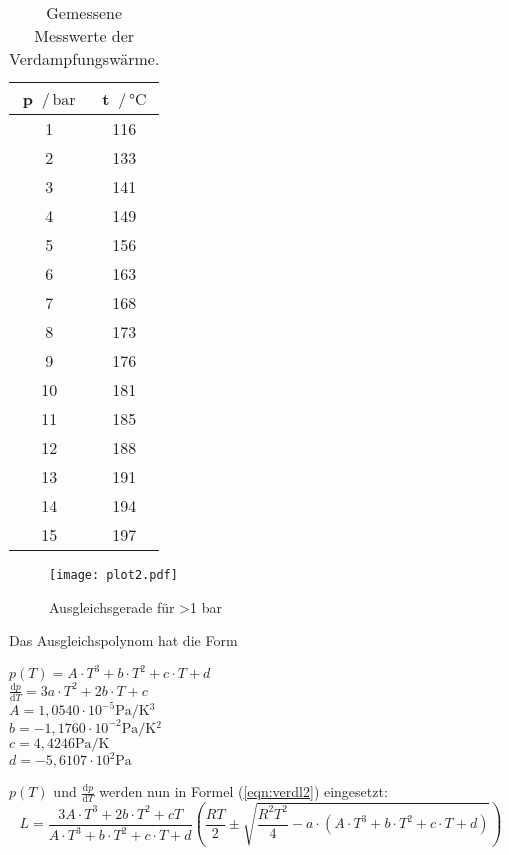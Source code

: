 \begin{table}[H]
  \centering
  \caption{Gemessene Messwerte der Verdampfungswärme.}
  \label{tab:werte1}
  \begin{tabular}{c c}
    \toprule
    p $\,/\,\si{\bar}$ & t $\,/\, \si{\celsius}$ \\
    \midrule
    1 & 116 \\
    2 & 133 \\
    3 & 141 \\
    4 & 149 \\
    5 & 156 \\
    6 & 163 \\
    7 & 168 \\
    8 & 173 \\
    9 & 176 \\
    10 & 181 \\
    11 & 185 \\
    12 & 188 \\
    13 & 191 \\
    14 & 194 \\
    15 & 197 \\
    \bottomrule
  \end{tabular}
\end{table}

\begin{figure}
  \centering
  \texttt{[image: plot2.pdf]}
  \caption{Ausgleichsgerade für >1 bar}
  \label{fig:plot2}
\end{figure}
\newpage
Das Ausgleichspolynom hat die Form
\begin{center}
  $p(T)= A \cdot T^3 + b \cdot T^2 + c \cdot T + d$ \\
  $\frac{\mathrm{d}p}{\mathrm{d}T} = 3a \cdot T^2 + 2b \cdot T + c$ \\
  $A = 1,0540 \cdot 10^{-5} \si{\pascal\per\kelvin^3} $  \\
  $b = -1,1760 \cdot 10^{-2} \si{\pascal\per\kelvin^2} $ \\
  $c = 4,4246 \si{\pascal\per\kelvin} $ \\
  $d = -5,6107 \cdot 10^2 \si{\pascal} $ \\
\end{center}
$p(T)$ und $\frac{\mathrm{d}p}{\mathrm{d}T}$ werden nun in Formel (\ref{eqn:verdl2}) eingesetzt:
\begin{equation*}
  L = \frac{3A \cdot T^3 + 2b \cdot T^2 + cT}{A \cdot T^3 + b \cdot T^2 + c \cdot T + d} \left(\frac{RT}{2} \pm \sqrt{\frac{R^2T^2}{4}-a\cdot(A \cdot T^3 + b \cdot T^2 + c \cdot T + d)}\right)
\end{equation*}

